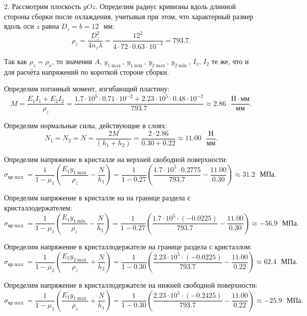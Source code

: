 2. Рассмотрим плоскость $yOz$. Определим радиус кривизны вдоль длинной стороны сборки после охлаждения, учитывыя при этом, что характерный размер вдоль оси $z$ равна $D_z = b = 12 \text{ } мм$:
\[
    \rho_z = \frac{D_z^2}{4 n_z \lambda}
           = \frac{12^2}{4 \cdot 72 \cdot 0.63 \cdot 10^{-3}}
           = 793.7.
\]

Так как $\rho_z = \rho_x$, то значения $A$, $y_{1 \max}$, $y_{1 \min}$, $y_{2 \max}$, $y_{2 \min}$, $I_1$, $I_2$ те же, что и для расчёта напряжений по короткой стороне сборки.

Определим погонный момент, изгибающий пластину:
\[
    M = \frac{E_1 I_1 + E_2 I_2}{\rho_z}
      = \frac{1.7 \cdot 10^5 \cdot 0.71 \cdot 10^{-2} + 2.23 \cdot 10^5 \cdot 0.48 \cdot 10^{-2}}{793.7}
      \approx 2.86 \text{ } \frac{Н \cdot мм}{мм}.
\]

Определим нормальные силы, действующие в слоях:
\[
    N_1 = N_2 = N
        = \frac{2M}{(h_1 + h_2)}
        = \frac{2 \cdot 2.86}{0.30 + 0.22}
        \approx 11.00 \text{ } \frac{Н}{мм}.
\]

Определим напряжение в кристалле на верхней свободной поверхности:
\[
    \sigma_{кр \max} = \frac{1}{1 - \mu_1} \left(\frac{E_1 y_{1\max}}{\rho_z} - \frac{N}{h_1}\right)
                     = \frac{1}{1 - 0.27} \left(\frac{1.7 \cdot 10^5 \cdot 0.2775}{793.7} - \frac{11.00}{0.30}\right)
                     \approx 31.2 \text{ } МПа.
\]

Определим напряжение в кристалле на на границе раздела с кристаллодержателем:
\[
    \sigma_{кр \max} = \frac{1}{1 - \mu_1} \left(\frac{E_1 y_{1\min}}{\rho_z} - \frac{N}{h_1}\right)
                     = \frac{1}{1 - 0.27} \left(\frac{1.7 \cdot 10^5 \cdot (-0.0225)}{793.7} - \frac{11.00}{0.30}\right)
                     \approx -56.9\text{ } МПа.
\]

Определим напряжение в кристаллодержателе на границе раздела с кристаллом:
\[
    \sigma_{кр \max} = \frac{1}{1 - \mu_2} \left(\frac{E_2 y_{2\max}}{\rho_z} + \frac{N}{h_2}\right)
                     = \frac{1}{1 - 0.30} \left(\frac{2.23 \cdot 10^5 \cdot (-0.0225)}{793.7} - \frac{11.00}{0.22}\right)
                     \approx 62.4\text{ } МПа.
\]

Определим напряжение в кристаллодержателе на нижней свободной поверхности:
\[
    \sigma_{кр \max} = \frac{1}{1 - \mu_1} \left(\frac{E_1 y_{1\max}}{\rho_z} + \frac{N}{h_1}\right)
                     = \frac{1}{1 - 0.30} \left(\frac{2.23 \cdot 10^5 \cdot (-0.2425)}{793.7} - \frac{11.00}{0.22}\right)
                     \approx -25.9\text{ } МПа.
\]

